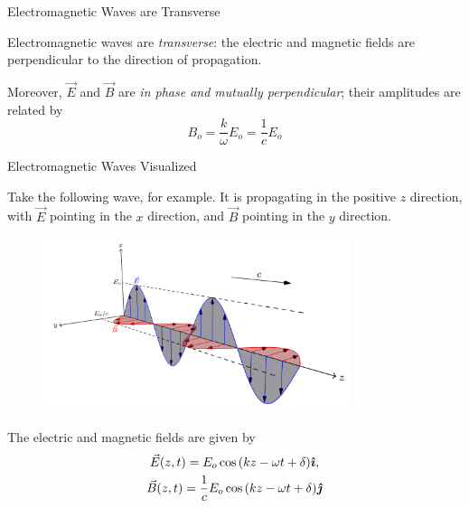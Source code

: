 \documentclass{beamer}
\begin{document}
\begin{frame}{Electromagnetic Waves are Transverse}

Electromagnetic waves are \emph{transverse}: the electric and magnetic fields are perpendicular to the direction of propagation.

\vfill

Moreover, $\vec{E}$ and $\vec{B}$ are \emph{in phase and mutually perpendicular}; their amplitudes are related by
\begin{equation*}
    B_o = \frac{k}{\omega} E_o = \frac{1}{c} E_o
\end{equation*}

\end{frame}

\begin{frame}{Electromagnetic Waves Visualized}

Take the following wave, for example. It is propagating in the positive $z$ direction, with $\vec{E}$ pointing in the $x$ direction, and $\vec{B}$ pointing in the $y$ direction.

\vspace{-0.4em}

\begin{figure}[H]
\centering
\includegraphics[width=0.8\textwidth]{figures/em_wave.png}
\end{figure}

\vspace{-1.6em}

The electric and magnetic fields are given by
\begin{gather*}
    \vec{E} (z, t) = E_o \cos{\left( kz - \omega t + \delta \right)} \bm{\hat{\imath}}, \\
    \vec{B} (z, t) = \frac{1}{c} E_o \cos{\left( kz - \omega t + \delta \right)} \bm{\hat{\jmath}}
\end{gather*}

\end{frame}
\end{document}

